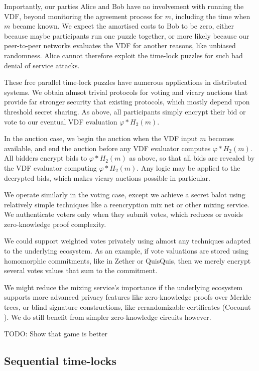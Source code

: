 \documentclass{article}
\begin{document}
Importantly, our parties Alice and Bob have no involvement with
running the VDF, beyond monitoring the agreement process for $m$,
including the time when $m$ became known.  We expect the amortised
costs to Bob to be zero, either because maybe participants run one
puzzle together, or more likely because our peer-to-peer networks
evaluates the VDF for another reasons, like unbiased randomness.
Alice cannot therefore exploit the time-lock puzzles for such bad
denial of service attacks.

These free parallel time-lock puzzles have numerous applications in
distributed systems.  We obtain almsot trivial protocols for voting
and vicary auctions that provide far stronger security that existing
protocols, which mostly depend upon threshold secret sharing.
As above, all participants simply encrypt their bid or vote to our
eventual VDF evaluation $φ* H_2(m)$.  

In the auction case, we begin the auction when the VDF input $m$
becomes available, and end the auction before any VDF evaluator
computes $φ* H_2(m)$.  All bidders encrypt bids to $φ* H_2(m)$ as
above, so that all bids are revealed by the VDF evaluator computing
$φ* H_2(m)$.  Any logic may be applied to the decrypted bids,
which makes vicary auctions possible in particular.

We operate similarly in the voting case, except we achieve a secret
balot using relatively simple techniques like a reencryption mix net
or other mixing service.  We authenticate voters only when they submit
votes, which reduces or avoids zero-knowledge proof complexity.

We could support weighted votes privately using almost any techniques
adapted to the underlying ecosystem.  As an example, if vote valuations
are stored using homomorphic commitments, like in Zether or QuisQuis,
then we merely encrypt several votes values that sum to the commitment.

We might reduce the mixing service's importance if the underlying
ecosystem supports more advanced privacy features like zero-knowledge
proofs over Merkle trees, or blind signature constructions, like
rerandomizable certificates (Coconut \cite{Coconut}).
We do still benefit from simpler zero-knowledge circuits however.


TODO: Show that game is better

\subsection{Sequential time-locks}
\end{document}

